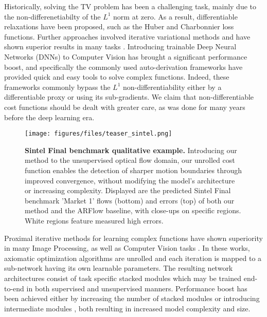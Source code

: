 \documentclass[10pt,twocolumn,letterpaper]{article}
\begin{document}
Historically, solving the TV problem has been a challenging task, mainly due to the non-differenetiabilty of the $L^1$ norm at zero. 
As a result, differentiable relaxations have been proposed, such as the Huber \cite{huber1964robust} and Charbonnier \cite{charbonnier1997deterministic} loss functions. Further approaches involved iterative variational methods and have shown superior results in many tasks \cite{admm0,zach2007duality,RUDIN1992259}.
Introducing trainable Deep Neural Networks (DNNs) to Computer Vision has brought a significant performance boost, and specifically the commonly used auto-derivation frameworks \cite{pytorch,jia2014caffe,tensorflow2015-whitepaper} have provided quick and easy tools to solve complex functions. Indeed, these frameworks commonly bypass the $L^1$ non-differentiability either by a differentiable proxy or using its sub-gradients. We claim that non-differentiable cost functions should be dealt with greater care, as was done for many years before the deep learning era.

\begin{figure}
\begin{center}
\texttt{[image: figures/files/teaser\_sintel.png]}
\end{center}
   \caption{\textbf{Sintel Final benchmark qualitative example.}
Introducing our method to the unsupervised optical flow domain, our unrolled cost function enables the detection of sharper motion boundaries through improved convergence, without modifying the model's architecture or increasing complexity.
Displayed are the predicted Sintel Final benchmark 'Market 1' flows (bottom) and errors (top) of both our method and the ARFlow \cite{liu2020learning} baseline, with close-ups on specific regions.
   White regions feature measured high errors.
   }
\label{fig:teaser}
\end{figure}
 
Proximal iterative methods for learning complex functions have shown superiority in many Image Processing, as well as Computer Vision tasks \cite{wang2016proximal,monga2019algorithm,zhang2020deep}. In these works, axiomatic optimization algorithms are unrolled and each iteration is mapped to a sub-network having its own learnable parameters. The resulting network architectures consist of task specific stacked modules which may be trained end-to-end in both supervised and unsupervised manners. Performance boost has been achieved either by increasing the number of stacked modules \cite{wang2016proximal} or introducing intermediate modules  \cite{luo2021upflow,wang2020cot}, both resulting in increased model complexity and size.
\end{document}
